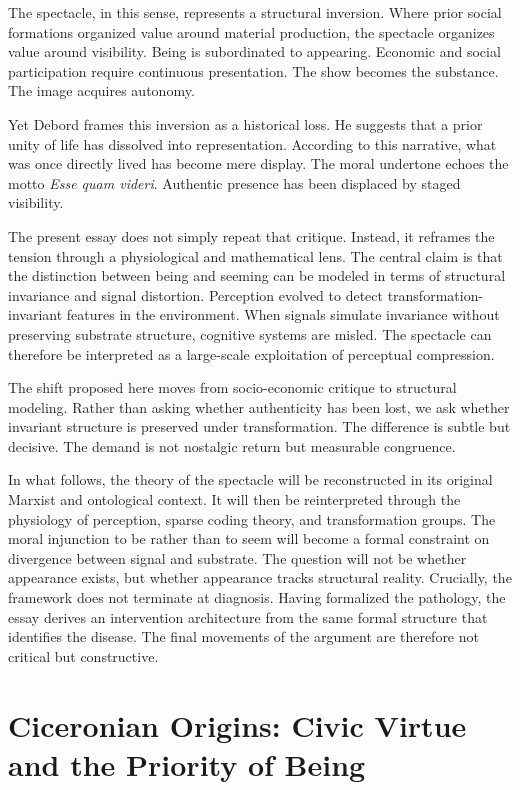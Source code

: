 \documentclass[11pt]{article}
\begin{document}
The spectacle, in this sense, represents a structural inversion. Where prior social formations organized value around material production, the spectacle organizes value around visibility. Being is subordinated to appearing. Economic and social participation require continuous presentation. The show becomes the substance. The image acquires autonomy.

Yet Debord frames this inversion as a historical loss. He suggests that a prior unity of life has dissolved into representation. According to this narrative, what was once directly lived has become mere display. The moral undertone echoes the motto \textit{Esse quam videri}. Authentic presence has been displaced by staged visibility.

The present essay does not simply repeat that critique. Instead, it reframes the tension through a physiological and mathematical lens. The central claim is that the distinction between being and seeming can be modeled in terms of structural invariance and signal distortion. Perception evolved to detect transformation-invariant features in the environment. When signals simulate invariance without preserving substrate structure, cognitive systems are misled. The spectacle can therefore be interpreted as a large-scale exploitation of perceptual compression.

The shift proposed here moves from socio-economic critique to structural modeling. Rather than asking whether authenticity has been lost, we ask whether invariant structure is preserved under transformation. The difference is subtle but decisive. The demand is not nostalgic return but measurable congruence.

In what follows, the theory of the spectacle will be reconstructed in its original Marxist and ontological context. It will then be reinterpreted through the physiology of perception, sparse coding theory, and transformation groups. The moral injunction to be rather than to seem will become a formal constraint on divergence between signal and substrate. The question will not be whether appearance exists, but whether appearance tracks structural reality. Crucially, the framework does not terminate at diagnosis. Having formalized the pathology, the essay derives an intervention architecture from the same formal structure that identifies the disease. The final movements of the argument are therefore not critical but constructive.

\section{Ciceronian Origins: Civic Virtue and the Priority of Being}
\end{document}
